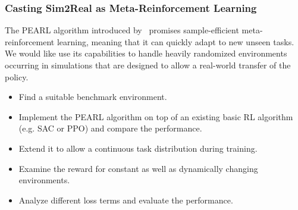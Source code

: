 \documentclass[a4paper]{article}
\begin{document}




\subsubsection{Casting Sim2Real as Meta-Reinforcement Learning}
The PEARL algorithm introduced by~\citet{rakelly2019} promises sample-efficient meta-reinforcement learning, meaning that it can quickly adapt to new unseen tasks. We would like use its capabilities to handle heavily randomized environments occurring in simulations that are designed to allow a real-world transfer of the policy.
\begin{itemize}
  \item Find a suitable benchmark environment.
  \item Implement the PEARL algorithm on top of an existing basic RL algorithm (e.g. SAC or PPO) and compare the performance.
  \item Extend it to allow a continuous task distribution during training.
  \item Examine the reward for constant as well as dynamically changing environments.
  \item Analyze different loss terms and evaluate the performance.
\end{itemize}









\end{document}
